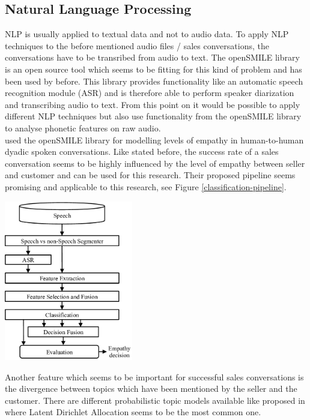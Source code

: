 \documentclass[twoside]{article}
\begin{document}
\begin{multicols}{2}
\subsection{Natural Language Processing}

NLP is usually applied to textual data and not to audio data. To apply NLP techniques to the before mentioned audio files / sales conversations, the conversations have to be transribed from audio to text. The openSMILE library is an open source tool which seems to be fitting for this kind of problem and has been used by \cite{Eyben2013} before. This library provides functionality like an automatic speech recognition module (ASR) and is therefore able to perform speaker diarization and transcribing audio to text. From this point on it would be possible to apply different NLP techniques but also use functionality from the openSMILE library to analyse phonetic features on raw audio.\\
\cite{Alam2017} used the openSMILE library for modelling levels of empathy in human-to-human dyadic spoken conversations. Like stated before, the success rate of a sales conversation seems to be highly influenced by the level of empathy between seller and customer and can be used for this research. Their proposed pipeline seems promising and applicable to this research, see Figure \ref{classification-pipeline}.

\begin{center}
  \includegraphics[height=70mm]{images/pipeline.png}
  \label{classification-pipeline}
\end{center}



Another feature which seems to be important for successful sales conversations is the divergence between topics which have been mentioned by the seller and the customer. There are different probabilistic topic models available like proposed in \cite{topicmodels2007} where Latent Dirichlet Allocation seems to be the most common one.



\end{multicols}
\end{document}

